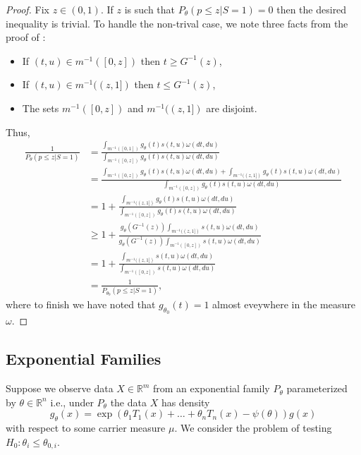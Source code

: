 \documentclass{article}
\newcommand{\R}{\mathbb{R}}
\begin{document}
\begin{appendix}
\begin{proof}

Fix $z \in (0, 1)$. If $z$ is such that $P_{\theta}(p \leq z | S = 1)  = 0$ then the desired inequality is trivial. To handle the non-trival case, we note three facts from the proof of :
\begin{itemize}
    \item If $(t, u) \in m^{-1}([0, z])$ then $t \geq G^{-1}(z)$,
    \item If $(t, u) \in m^{-1}((z, 1])$ then $t \leq G^{-1}(z)$,
    \item The sets $m^{-1}([0, z])$ and $m^{-1}((z, 1])$ are disjoint.
\end{itemize}
Thus,
\begin{align*}
     \frac{1}{P_{\theta}(p \leq z | S = 1)} &= \frac{\int_{m^{-1}([0, 1])} g_{\theta}(t) s(t, u) \omega(dt, du) }{\int_{m^{-1}([0, z])} g_{\theta}(t) s(t, u) \omega(dt, du) }\\
                                            &= \frac{\int_{m^{-1}([0, z])} g_{\theta}(t) s(t, u) \omega(dt, du) + \int_{m^{-1}((z, 1])} g_{\theta}(t)  s(t, u)\omega(dt, du) }{\int_{m^{-1}([0, z])} g_{\theta}(t) s(t, u) \omega(dt, du) }\\
                                            &= 1 + \frac{\int_{m^{-1}((z, 1])} g_{\theta}(t) s(t, u) \omega(dt, du)}{\int_{m^{-1}([0, z])} g_{\theta}(t) s(t, u) \omega(dt, du)}\\
                                            &\geq 1 + \frac{g_{\theta}(G^{-1}(z))  \int_{m^{-1}((z, 1])}  s(t, u) \omega(dt, du)}{g_{\theta}(G^{-1}(z)) \int_{m^{-1}([0, z])} s(t, u) \omega(dt, du)} \\
                                            &= 1 + \frac{\int_{m^{-1}((z, 1])} s(t, u) \omega(dt, du)}{ \int_{m^{-1}([0, z])} s(t, u) \omega(dt, du)} \\
                                            &= \frac{1}{P_{\theta_0}(p \leq z | S = 1)}, 
\end{align*}
where to finish we have noted that $g_{\theta_0}(t) = 1$ almost eveywhere in the measure $\omega$. 
\end{proof}

\subsection{Exponential Families}
\label{sec:one_sided_exp_fam_appdx}

Suppose we observe data $X \in \R^m$ from an exponential family $P_{\theta}$ parameterized by $\theta \in \R^n$ i.e., under $P_{\theta}$ the data $X$ has density  
\begin{equation*}
    g_{\theta}(x) = \exp( \theta_1 T_1(x) + \dots + \theta_n T_n(x) - \psi(\theta) ) g(x) 
\end{equation*}
with respect to some carrier measure $\mu$. We consider the problem of testing $H_0: \theta_i \leq \theta_{0, i}$.


\end{appendix}
\end{document}
